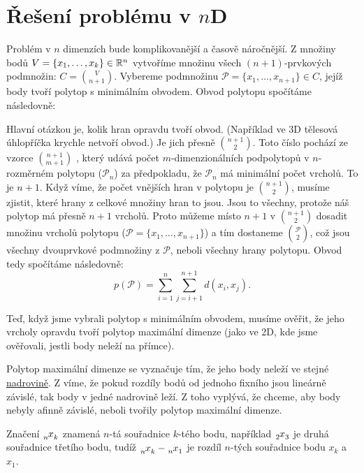 \section{Řešení problému v \texorpdfstring{$n$D}{nD}}
\label{sec:reseni_1D}

Problém v $n$ dimenzích bude komplikovanější a časově náročnější. Z množiny bodů $V = \{x_1,\ldots, x_k\} \in \mathbb{R}^n$ vytvoříme množinu všech $(n+1)$-prvkových podmnožin: $C = \binom{V}{n+1}$. Vybereme podmnožinu $\mathcal{P} = \{x_1, \dots, x_{n+1}\} \in C$, jejíž body tvoří polytop s minimálním obvodem. Obvod polytopu spočítáme následovně:

Hlavní otázkou je, kolik hran opravdu tvoří obvod. (Například ve $3$D tělesová úhlopříčka krychle netvoří obvod.) Je jich přesně $\binom{n+1}{2}$. Toto číslo pochází ze vzorce $\binom{n+1}{m+1}$ \autocite[120]{coxeter1973regular},
který udává počet $m$-dimenzionál\-ních podpolytopů v $n$-rozměrném polytopu ($\mathcal{P}_n$) za předpokladu, že $\mathcal{P}_n$ má minimální počet vrcholů. To je $n+1$. 
Když víme, že počet vnějších hran v polytopu je $\binom{n+1}{2}$, musíme zjistit, které hrany z celkové množiny hran to jsou. Jsou to všechny, protože náš polytop má přesně $n+1$ vrcholů. Proto můžeme místo $n+1$ v $\binom{n+1}{2}$ dosadit množinu vrcholů polytopu ($\mathcal{P} = \{x_1, \dots, x_{n+1}\}$) a tím dostaneme $\binom{\mathcal{P}}{2}$, což jsou všechny dvouprvkové podmnožiny z $\mathcal{P}$, neboli všechny hrany polytopu. Obvod tedy spočítáme následovně:
\begin{equation*}
  p(\mathcal{P}) = \sum_{i=1}^{n} \sum_{j=i+1}^{n+1}d(x_i, x_{j}).
\end{equation*}

Teď, když jsme vybrali polytop s minimálním obvodem, musíme ověřit, že jeho vrcholy opravdu tvoří polytop maximální dimenze (jako ve 2D, kde jsme ověřovali, jestli body neleží na přímce).

Polytop maximální dimenze se vyznačuje tím, že jeho body neleží ve stejné \hyperref[definice:nadrovina]{nadrovině}. Z  víme, že pokud rozdíly bodů od jednoho fixního jsou lineárně závislé, tak body v jedné nadrovině leží. Z toho vyplývá, že chceme, aby body nebyly afinně závislé, neboli tvořily polytop maximální dimenze.  

\begin{poznamka} 
  \label{poznamka:varovani_index}
  Značení $\x{n}{k}$ znamená $n$-tá souřadnice $k$-tého bodu, například $\x{2}{3}$ je dru\-há souřadnice třetího bodu, tudíž $\x{n}{k} - \x{n}{1}$ je rozdíl $n$-tých souřadnice bodu $x_k$ a $x_1$. 
\end{poznamka}

